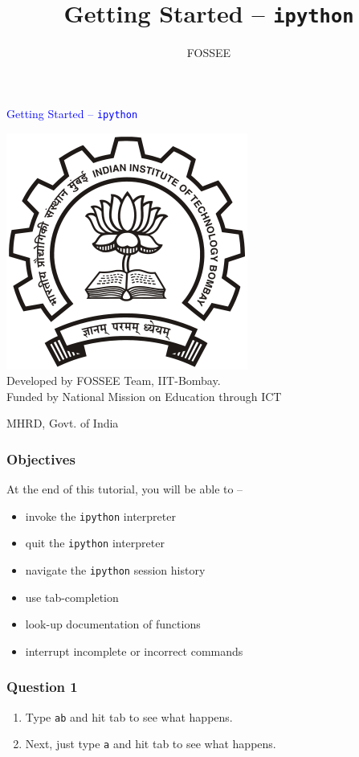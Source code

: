 \documentclass[presentation]{beamer}
\title{Getting Started -- \texttt{ipython}}
\author{FOSSEE}
\date{}
\begin{document}
\begin{frame}
  \frametitle{}
    \begin{center}
      \textcolor{blue}{Getting Started -- \texttt{ipython}}
    \end{center}
    \begin{center}
      \includegraphics[scale=0.25]{../images/iitb-logo.png}\\
      Developed by FOSSEE Team, IIT-Bombay. \\ 
      Funded by National Mission on Education through ICT

      MHRD, Govt. of India
    \end{center}
\end{frame}

\begin{frame}
\frametitle{Objectives}
\label{sec-1}
At the end of this tutorial, you will be able to --
\begin{itemize}
\item invoke the \texttt{ipython} interpreter
\item quit the \texttt{ipython} interpreter
\item navigate the \texttt{ipython} session history 
\item use tab-completion 
\item look-up documentation of functions
\item interrupt incomplete or incorrect commands
\end{itemize}
\end{frame}

\begin{frame}
\frametitle{Question 1}
\label{sec-2}
\begin{enumerate}
\item Type \texttt{ab} and hit tab to see what happens.
\item Next, just type \texttt{a} and hit tab to see what happens.
\end{enumerate}
\end{frame}
\end{document}
